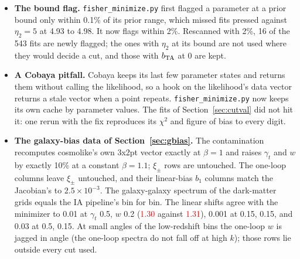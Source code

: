 \documentclass[11pt]{article}
\newif\ifnumbersfinal
\newcommand{\refresh}[1]{\ifnumbersfinal#1\else\textcolor{red}{#1}\fi}
\newcommand{\CClinMap}{\refresh{0.005}}
\newcommand{\LLnoise}{\refresh{0.11 to 0.16}}
\newcommand{\GBbaseTot}{\refresh{1.31}}      %
\newcommand{\GBbaseMAP}{\refresh{1.30}}      %
\begin{document}
\begin{itemize}
    3x2pt run); 16 per-bin runs have a source bin with no data, where only
    the Fisher matrix with the flat priors is defined. In every run of the
    earlier split the pieces add up to the linear shift of the base's model
    error to $10^{-8}$, for both of its splits. The linear shift of the direct error agrees
    with the MAP to \CClinMap{} in the figure of bias at $K_0 = 0.3$ to 0.4
    on the stitched truth and to 0.02 on the linear-limit truth. The
    linear-limit base, built with a separately compiled sim-IA library
    (\texttt{interface\_sim/}, the installed one predating the patch),
    rebuilds the stitched base bit for bit. Of the amplitude piece on the
    linear-limit truth, measurement noise of the constants accounts for
    \LLnoise{} (20000 Gaussian draws of the constants, propagated through
    the same linear map).
  \item \textbf{The bound flag.} \texttt{fisher\_minimize.py} first flagged
    a parameter at a prior bound only within 0.1\% of its prior range, which
    missed fits pressed against $\eta_2 = 5$ at 4.93 to 4.98. It now flags
    within 2\%. Rescanned with 2\%, 16 of the 543 fits are newly flagged; the
    ones with $\eta_2$ at its bound are not used where they would decide a
    cut, and those with $b_{\rm TA}$ at 0 are kept.
  \item \textbf{A Cobaya pitfall.} Cobaya keeps its last few parameter
    states and returns them without calling the likelihood, so a hook on
    the likelihood's data vector returns a stale vector when a point
    repeats. \texttt{fisher\_minimize.py} now keeps its own cache by
    parameter values. The fits of Section~\ref{sec:cutval} did not hit
    it: one rerun with the fix reproduces its $\chi^2$ and figure of bias
    to every digit.
  \item \textbf{The galaxy-bias data of Section~\ref{sec:gbias}.} The
    contamination recomputes cosmolike's own 3x2pt vector exactly at
    $\beta = 1$ and raises $\gamma_t$ and $w$ by exactly 10\% at a
    constant $\beta = 1.1$; $\xi_\pm$ rows are untouched. The one-loop
    columns leave $\xi_\pm$ untouched, and their linear-bias $b_1$ columns
    match the Jacobian's to $2.5\times10^{-3}$. The galaxy-galaxy spectrum
    of the dark-matter grids equals the IA pipeline's bin for bin. The
    linear shifts agree with the minimizer to 0.01 at $\gamma_t$ 0.5, $w$
    0.2 (\GBbaseMAP{} against \GBbaseTot), 0.001 at 0.15, 0.15, and 0.03
    at 0.5, 0.15. At small angles of the low-redshift bins the one-loop $w$
    is jagged in angle (the one-loop spectra do not fall off at high $k$);
    those rows lie outside every cut used.
\end{itemize}
\end{document}
